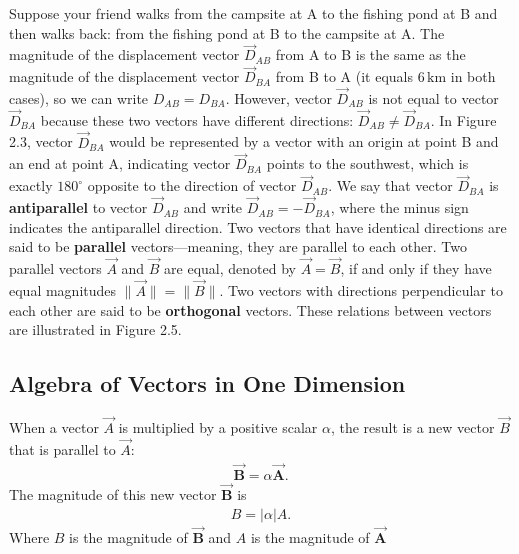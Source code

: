 \documentclass{report}
\begin{document}
    \pagebreak \bigbreak \noindent 
    Suppose your friend walks from the campsite at A to the fishing pond at B and then walks back: from the fishing pond at B to the campsite at A. The magnitude of the displacement vector $\vec{D}_{AB}$ from A to B is the same as the magnitude of the displacement vector $\vec{D}_{BA}$ from B to A (it equals $6\,\text{km}$ in both cases), so we can write $D_{AB} = D_{BA}$. However, vector $\vec{D}_{AB}$ is not equal to vector $\vec{D}_{BA}$ because these two vectors have different directions: $\vec{D}_{AB} \neq \vec{D}_{BA}$. In Figure 2.3, vector $\vec{D}_{BA}$ would be represented by a vector with an origin at point B and an end at point A, indicating vector $\vec{D}_{BA}$ points to the southwest, which is exactly $180^\circ$ opposite to the direction of vector $\vec{D}_{AB}$. We say that vector $\vec{D}_{BA}$ is \textbf{antiparallel} to vector $\vec{D}_{AB}$ and write $\vec{D}_{AB} = -\vec{D}_{BA}$, where the minus sign indicates the antiparallel direction.
    \bigbreak \noindent 
    Two vectors that have identical directions are said to be \textbf{parallel} vectors—meaning, they are parallel to each other. Two parallel vectors $\vec{A}$ and $\vec{B}$ are equal, denoted by $\vec{A} = \vec{B}$, if and only if they have equal magnitudes $\lVert \vec{A} \rVert = \lVert \vec{B} \rVert$. Two vectors with directions perpendicular to each other are said to be \textbf{orthogonal} vectors. These relations between vectors are illustrated in Figure 2.5.
    \bigbreak \noindent 
    
    \pagebreak \bigbreak \noindent 
    \subsection{Algebra of Vectors in One Dimension}
    \bigbreak \noindent 
    \begin{dfn}[Scalars]
        When a vector $\vec{A}$ is multiplied by a positive scalar $\alpha$, the result is a new vector $\vec{B}$ that is parallel to $\vec{A}$:
        \begin{align*}
            \vec{\textbf{B}} = \alpha \vec{\textbf{A}}
        .\end{align*}
        The magnitude of this new vector $\vec{\textbf{B}}$ is 
        \begin{align*}
            B = |\alpha|A
        .\end{align*}
        Where $B$ is the magnitude of $\vec{\textbf{B}} $ and $A$ is the magnitude of $\vec{\textbf{A}} $ 
    \end{dfn}
    \bigbreak \noindent 
\end{document}
